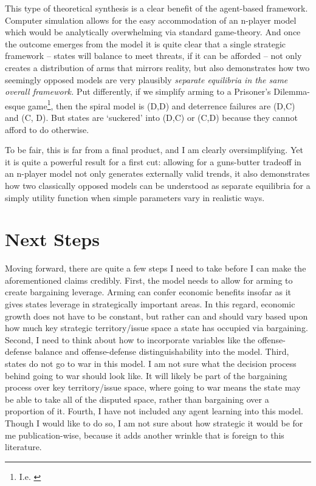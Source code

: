 \documentclass[12pt]{article}
\begin{document}
This type of theoretical synthesis is a clear benefit of the agent-based framework. Computer simulation allows for the easy accommodation of an n-player model which would be analytically overwhelming via standard game-theory. And once the outcome emerges from the model it is quite clear that a single strategic framework -- states will balance to meet threats, if it can be afforded -- not only creates a distribution of arms that mirrors reality, but also demonstrates how two seemingly opposed models are very plausibly \textit{separate equilibria in the same overall framework.} Put differently, if we simplify arming to a Prisoner's Dilemma-esque game\footnote{I.e. \citet{jervis1978}}, then the spiral model is (D,D) and deterrence failures are (D,C) and (C, D). But states are `suckered' into (D,C) or (C,D) because they cannot afford to do otherwise.

To be fair, this is far from a final product, and I am clearly oversimplifying. Yet it is quite a powerful result for a first cut: allowing for a guns-butter tradeoff in an n-player model not only generates externally valid trends, it also demonstrates how two classically opposed models can be understood as separate equilibria for a simply utility function when simple parameters vary in realistic ways.


\section{Next Steps}\label{next steps}

Moving forward, there are quite a few steps I need to take before I can make the aforementioned claims credibly. First, the model needs to allow for arming to create bargaining leverage. Arming can confer economic benefits insofar as it gives states leverage in strategically important areas. In this regard, economic growth does not have to be constant, but rather can and should vary based upon how much key strategic territory/issue space a state has occupied via bargaining. Second, I need to think about how to incorporate variables like the offense-defense balance and offense-defense distinguishability into the model. Third, states do not go to war in this model. I am not sure what the decision process behind going to war should look like. It will likely be part of the bargaining process over key territory/issue space, where going to war means the state may be able to take all of the disputed space, rather than bargaining over a proportion of it. Fourth, I have not included any agent learning into this model. Though I would like to do so, I am not sure about how strategic it would be for me publication-wise, because it adds another wrinkle that is foreign to this literature.
\end{document}
